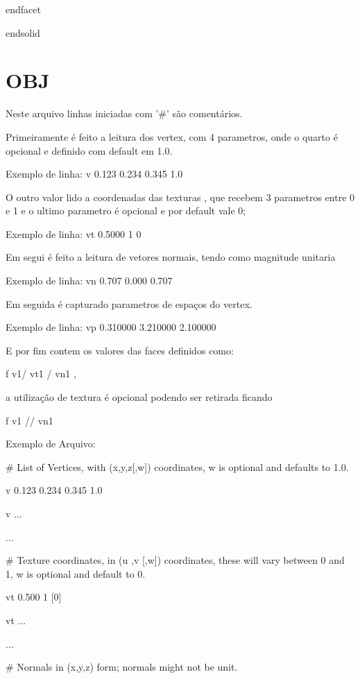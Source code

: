 \documentclass[12pt]{article}
\begin{document}
    endfacet
  
  endsolid 
 
 
 \section*{OBJ}
       Neste arquivo linhas iniciadas com '\#' s\~ao coment\'arios.
       
      Primeiramente \'e feito a leitura dos vertex, com 4 parametros, 
      onde o quarto \'e opcional e definido com default em 1.0.

      Exemplo de linha:
	v 0.123 0.234 0.345 1.0
	

      O outro valor lido a coordenadas das texturas , que recebem 3 parametros entre
      0 e 1 e o ultimo parametro \'e opcional e por default vale 0;
      
      Exemplo de linha:
       vt 0.5000 1 0
      
      Em segui \'e feito a leitura de vetores normais, tendo como magnitude unitaria
      
      Exemplo de linha:
      vn 0.707 0.000 0.707
      
      Em seguida \'e capturado parametros de espa\c{c}os do vertex.
      
      Exemplo de linha:
	vp 0.310000 3.210000 2.100000
	
      E por fim contem os valores das faces definidos como:
      
      f v1/ vt1 / vn1 ,
      
      a utiliza\c{c}\~ao de textura \'e opcional podendo ser retirada ficando
      
      f  v1 // vn1
      
      
      Exemplo de Arquivo:
      
      
      \# List of Vertices, with (x,y,z[,w]) coordinates, w is optional and defaults to 1.0.
  
      v 0.123 0.234 0.345 1.0
  
      v ...
  
     ...
  
     \# Texture coordinates, in (u ,v [,w]) coordinates, these will vary between 0 and 1, w is optional and default to 0.
  
     vt 0.500 1 [0]
  
     vt ...
  
     ...
  
     \# Normals in (x,y,z) form; normals might not be unit.
 
\end{document}
